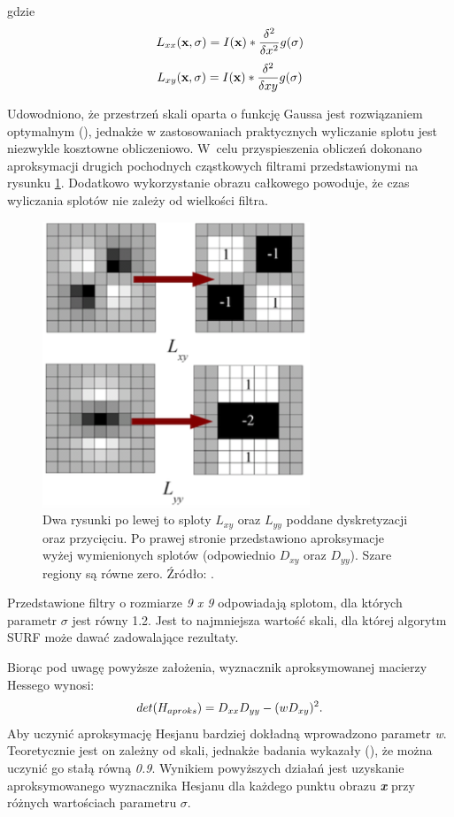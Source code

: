 gdzie 
\begin{equation}\textsl{}
L_{xx}(\textbf{x},\sigma) = I(\textbf{x})*\frac{\delta^2}{\delta x^2}g(\sigma)
\end{equation}
\begin{equation}\textsl{}
L_{xy}(\textbf{x},\sigma) = I(\textbf{x})*\frac{\delta^2}{\delta xy}g(\sigma)
\end{equation}

Udowodniono, że przestrzeń skali oparta o funkcję Gaussa jest rozwiązaniem optymalnym (\cite{SurfTemp1}), jednakże w zastosowaniach praktycznych wyliczanie splotu jest niezwykle kosztowne obliczeniowo. W~celu przyspieszenia obliczeń dokonano aproksymacji drugich pochodnych cząstkowych filtrami przedstawionymi na rysunku \ref{im: GaussianApproximation}. Dodatkowo wykorzystanie obrazu całkowego powoduje, że czas wyliczania splotów nie zależy od wielkości filtra. 
\begin{figure}[h]
	\includegraphics[width=8cm]{SurfLxyLyy}
	\centering
	\caption{Dwa rysunki po lewej to sploty \textit{$L_{xy}$} oraz \textit{$L_{yy}$} poddane dyskretyzacji oraz przycięciu. Po prawej stronie przedstawiono aproksymacje wyżej wymienionych splotów (odpowiednio \textit{$D_{xy}$} oraz \textit{$D_{yy}$}). Szare regiony są równe zero. Źródło: \cite{Surf}.}
	\label{im: GaussianApproximation}
\end{figure}

Przedstawione filtry o rozmiarze \textit{9 x 9} odpowiadają splotom, dla których parametr $\sigma$ jest równy 1.2. Jest to najmniejsza wartość skali, dla której algorytm SURF może dawać zadowalające rezultaty.

Biorąc pod uwagę powyższe założenia, wyznacznik aproksymowanej macierzy Hessego wynosi:
\begin{equation}\textsl{}
det(H_{aproks}) = D_{xx}D_{yy} - (wD_{xy})^2.
\end{equation}
Aby uczynić aproksymację Hesjanu bardziej dokładną wprowadzono parametr \textit{w}. Teoretycznie jest on zależny od skali, jednakże badania wykazały (\cite{Surf}), że można uczynić go stałą równą \textit{0.9}.  
Wynikiem powyższych działań jest uzyskanie aproksymowanego wyznacznika Hesjanu dla każdego punktu obrazu \textit{\textbf{x}} przy różnych wartościach parametru $\sigma$.

